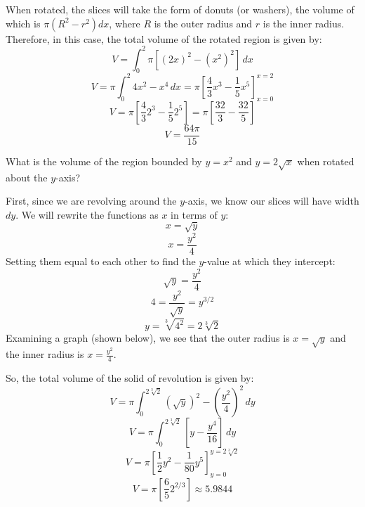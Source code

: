 When rotated, the slices will take the form of donuts (or washers), the volume 
of which is $\pi \left( R^2 - r^2 \right) dx$, where $R$ is the outer radius 
and $r$ is the inner radius. Therefore, in this case, the total volume of the 
rotated region is given by:
$$V = \int_0^2 \pi \left[ \left( 2x \right)^2 - \left(x^2 \right)^2 \right]\,
dx$$
$$V = \pi \int_0^2 4x^2 - x^4\,dx = \pi \left[\frac{4}{3}x^3 - \frac{1}{5}x^5 
\right]_{x = 0}^{x = 2}$$
$$V = \pi \left[\frac{4}{3}2^3 - \frac{1}{5}2^5 \right] = \pi \left[ \frac{32}{
3} - \frac{32}{5} \right] $$
$$V = \frac{64 \pi}{15} $$

\begin{Exercise}[label = volume2]
What is the volume of the region bounded by $y = x^2$ and $y = 2\sqrt{x}$ when 
rotated about the $y$-axis? 
\vspace{75mm}
\end{Exercise}

\begin{Answer}[ref = volume 2]
First, since we are revolving around the $y$-axis, we know our slices will 
have width $dy$. We will rewrite the functions as $x$ in terms of $y$:
$$x = \sqrt{y}$$
$$x = \frac{y^2}{4}$$
Setting them equal to each other to find the $y$-value at which they intercept:
$$\sqrt{y} = \frac{y^2}{4}$$
$$4 = \frac{y^2}{\sqrt{y}} = y^{3/2}$$
$$y = \sqrt[3]{4^2} = 2\sqrt[3]{2}$$
Examining a graph (shown below), we see that the outer radius is $x = \sqrt{y}$
and the inner radius is $x = \frac{y^2}{4}$. 


So, the total volume of the solid of revolution is given by:
$$V = \pi \int_0^{2\sqrt[3]{2}} \left(\sqrt{y} \right)^2 - \left( \frac{y^2}{4} 
\right)^2\,dy$$
$$V = \pi \int_0^{2\sqrt[3]{2}} \left[ y - \frac{y^4}{16} \right]\,dy$$
$$V = \pi \left[ \frac{1}{2}y^2 - \frac{1}{80}y^5 \right]_{y = 0}^{y = 
2\sqrt[3]{2}}$$
$$V = \pi \left[ \frac{6}{5} 2^{2/3} \right] \approx 5.9844$$
\end{Answer}

